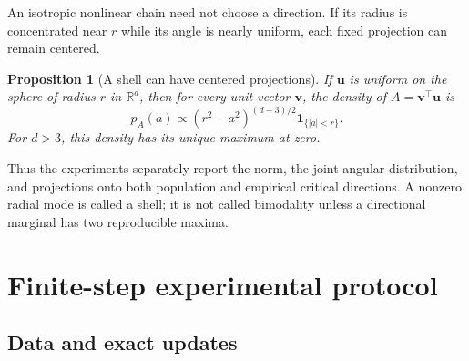 \documentclass[11pt]{article}
\newtheorem{proposition}[theorem]{Proposition}
\theoremstyle{definition}
\newcommand{\R}{\mathbb R}
\newcommand{\uvec}{\mathbf u}
\newcommand{\vvec}{\mathbf v}
\newcommand{\ind}{\mathbf 1}
\begin{document}
An isotropic nonlinear chain need not choose a direction.  If its radius is
concentrated near $r$ while its angle is nearly uniform, each fixed
projection can remain centered.

\begin{proposition}[A shell can have centered projections]
\label{prop:shell}
If $\uvec$ is uniform on the sphere of radius $r$ in $\R^d$, then for every
unit vector $\vvec$, the density of $A=\vvec^\top\uvec$ is
\begin{equation}
  p_A(a)\propto
  (r^2-a^2)^{(d-3)/2}\ind_{\{|a|<r\}}.
  \label{eq:sphere-projection}
\end{equation}
For $d>3$, this density has its unique maximum at zero.
\end{proposition}

Thus the experiments separately report the norm, the joint angular
distribution, and projections onto both population and empirical critical
directions.  A nonzero radial mode is called a shell; it is not called
bimodality unless a directional marginal has two reproducible maxima.

\section{Finite-step experimental protocol}
\label{sec:protocol}

\subsection{Data and exact updates}
\end{document}
